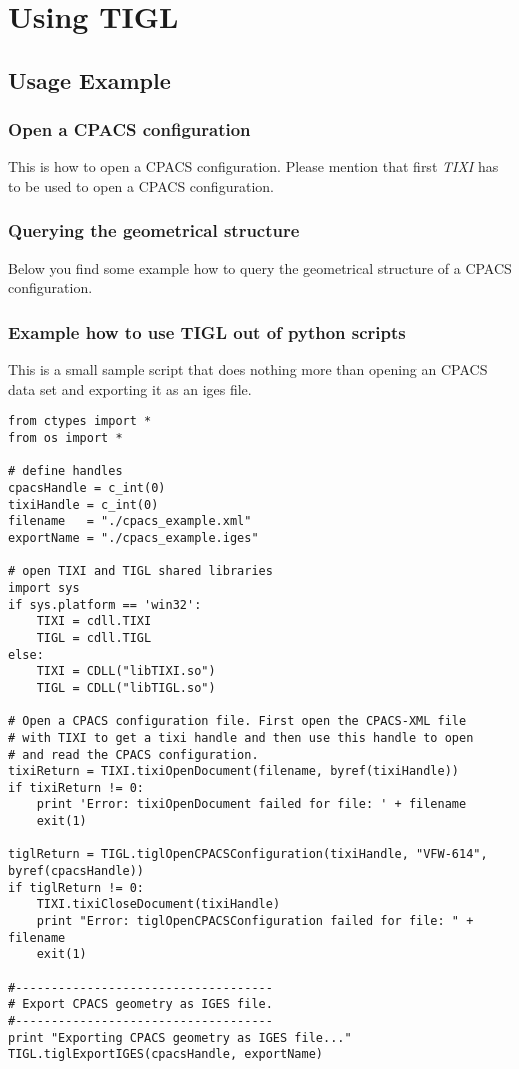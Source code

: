 
\chapter{Using TIGL}\label{usingTIGL}

\section{Usage Example}\label{Usage Example}

\subsection{Open a CPACS configuration}
This is how to open a CPACS configuration. Please mention that first \emph{TIXI} has to be used to open a CPACS configuration.


\subsection{Querying the geometrical structure}
Below you find some example how to query the geometrical structure of a CPACS configuration.


\subsection{Example how to use TIGL out of python scripts}
This is a small sample script that does nothing more than opening an CPACS data set and exporting it as an iges file.

\begin{verbatim}
from ctypes import *
from os import *

# define handles
cpacsHandle = c_int(0)
tixiHandle = c_int(0)
filename   = "./cpacs_example.xml"
exportName = "./cpacs_example.iges"

# open TIXI and TIGL shared libraries
import sys
if sys.platform == 'win32':
    TIXI = cdll.TIXI
    TIGL = cdll.TIGL
else:
    TIXI = CDLL("libTIXI.so")
    TIGL = CDLL("libTIGL.so")

# Open a CPACS configuration file. First open the CPACS-XML file
# with TIXI to get a tixi handle and then use this handle to open
# and read the CPACS configuration.
tixiReturn = TIXI.tixiOpenDocument(filename, byref(tixiHandle))
if tixiReturn != 0:
    print 'Error: tixiOpenDocument failed for file: ' + filename
    exit(1)

tiglReturn = TIGL.tiglOpenCPACSConfiguration(tixiHandle, "VFW-614", byref(cpacsHandle))
if tiglReturn != 0:
    TIXI.tixiCloseDocument(tixiHandle)
    print "Error: tiglOpenCPACSConfiguration failed for file: " + filename
    exit(1)

#------------------------------------
# Export CPACS geometry as IGES file.
#------------------------------------
print "Exporting CPACS geometry as IGES file..."
TIGL.tiglExportIGES(cpacsHandle, exportName)

\end{verbatim}





